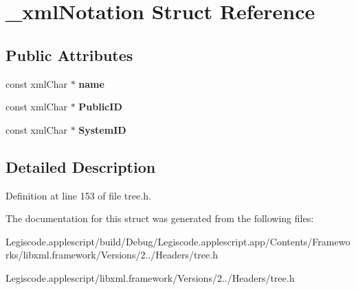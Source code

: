 \hypertarget{struct__xml_notation}{\section{\-\_\-xml\-Notation Struct Reference}
\label{struct__xml_notation}
}
\subsection*{Public Attributes}
\begin{DoxyCompactItemize}
\item 
\hypertarget{struct__xml_notation_a696d7ee623b3fff8dbb76d397b63abf8}{const xml\-Char $\ast$ {\bfseries name}}\label{struct__xml_notation_a696d7ee623b3fff8dbb76d397b63abf8}

\item 
\hypertarget{struct__xml_notation_a37865948f9c0b13d1c2c877fce12425e}{const xml\-Char $\ast$ {\bfseries Public\-I\-D}}\label{struct__xml_notation_a37865948f9c0b13d1c2c877fce12425e}

\item 
\hypertarget{struct__xml_notation_ad9d8e72be291bd6eff7075e2a6451aac}{const xml\-Char $\ast$ {\bfseries System\-I\-D}}\label{struct__xml_notation_ad9d8e72be291bd6eff7075e2a6451aac}

\end{DoxyCompactItemize}


\subsection{Detailed Description}


Definition at line 153 of file tree.\-h.



The documentation for this struct was generated from the following files\-:\begin{DoxyCompactItemize}
\item 
Legiscode.\-applescript/build/\-Debug/\-Legiscode.\-applescript.\-app/\-Contents/\-Frameworks/libxml.\-framework/\-Versions/2../\-Headers/tree.\-h\item 
Legiscode.\-applescript/libxml.\-framework/\-Versions/2../\-Headers/tree.\-h\end{DoxyCompactItemize}
